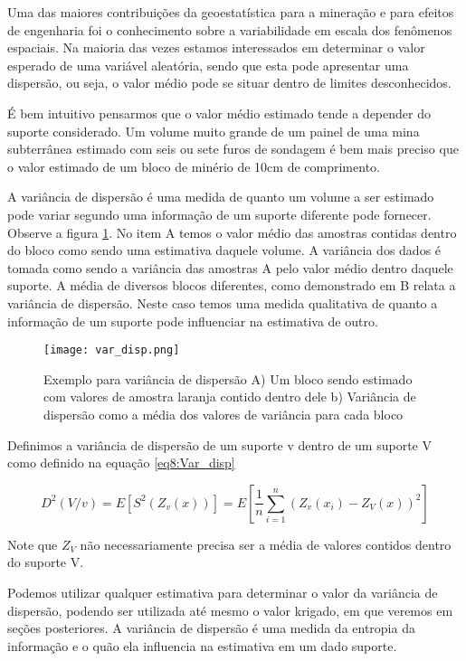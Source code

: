 Uma das maiores contribuições da geoestatística para a mineração e para efeitos de engenharia foi o conhecimento sobre a variabilidade em escala dos fenômenos espaciais. Na maioria das vezes estamos interessados em determinar o valor esperado de uma variável aleatória, sendo que esta pode apresentar uma dispersão, ou seja, o valor médio pode se situar dentro de limites desconhecidos. 

É bem intuitivo pensarmos que o valor médio estimado tende a depender do suporte considerado. Um volume muito grande de um painel de uma mina subterrânea estimado com seis ou sete furos de sondagem é bem mais preciso que o valor estimado de um bloco de minério de 10cm de comprimento.

A variância de dispersão é uma medida de quanto um volume a ser estimado pode variar segundo uma informação de um suporte diferente pode fornecer. Observe a figura \ref{var_disp}. No item A temos o valor médio das amostras contidas dentro do bloco como sendo uma estimativa daquele volume. A variância dos dados é tomada como sendo a variância das amostras A pelo valor médio dentro daquele suporte. A média de diversos blocos diferentes, como demonstrado em B relata a variância de dispersão. Neste caso temos uma medida qualitativa de quanto a informação de um suporte pode influenciar na estimativa de outro. 

\begin{figure}[H]
\centering
\texttt{[image: var\_disp.png]}
\caption{Exemplo para variância de dispersão A) Um bloco sendo estimado com valores de amostra laranja contido dentro dele b) Variância de dispersão como a média dos valores de variância para cada bloco}
\label{var_disp}
\end{figure}

Definimos a variância de dispersão de um suporte v dentro de um suporte V como definido na equação \eqref{eq8:Var_disp}

\begin{equation}\label{eq8:Var_disp}
D^{2}(V/v)=E[S^{2}(Z_{v}(x))]=E\left[\frac{1}{n}\sum_{i=1}^{n}\left(Z_{v}(x_{i})-Z_{V}(x)\right)^2\right]
\end{equation}


Note que $Z_{V}$ não necessariamente precisa ser a média de valores contidos dentro do suporte V.

Podemos utilizar qualquer estimativa para determinar o valor da variância de dispersão, podendo ser utilizada até mesmo o valor krigado, em que veremos em seções posteriores. A variância de dispersão é uma medida da entropia da informação e o quão ela influencia na estimativa em um dado suporte. 

